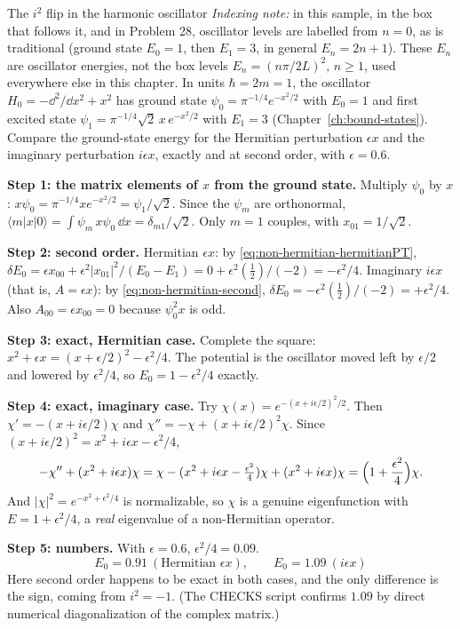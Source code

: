 \begin{sample}{The $i^2$ flip in the harmonic oscillator}
\emph{Indexing note:} in this sample, in the box that follows it, and in Problem 28, oscillator levels are labelled from $n=0$, as is traditional (ground state $E_0=1$, then $E_1=3$, in general $E_n=2n+1$). These $E_n$ are oscillator energies, not the box levels $E_n=(n\pi/2L)^2$, $n\ge1$, used everywhere else in this chapter. In units $\hbar=2m=1$, the oscillator $H_0=-\dd^2/\dd x^2+x^2$ has ground state $\psi_0=\pi^{-1/4}e^{-x^2/2}$ with $E_0=1$ and first excited state $\psi_1=\pi^{-1/4}\sqrt2\,x\,e^{-x^2/2}$ with $E_1=3$ (Chapter~\ref{ch:bound-states}). Compare the ground-state energy for the Hermitian perturbation $\epsilon x$ and the imaginary perturbation $i\epsilon x$, exactly and at second order, with $\epsilon=0.6$.

\textbf{Step 1: the matrix elements of $x$ from the ground state.} Multiply $\psi_0$ by $x$: $x\psi_0 = \pi^{-1/4}xe^{-x^2/2}=\psi_1/\sqrt2$. Since the $\psi_m$ are orthonormal, $\langle m|x|0\rangle = \int\psi_m\,x\psi_0\,\dd x = \delta_{m1}/\sqrt2$. Only $m=1$ couples, with $x_{01}=1/\sqrt2$.

\textbf{Step 2: second order.} Hermitian $\epsilon x$: by \eqref{eq:non-hermitian-hermitianPT}, $\delta E_0 = \epsilon x_{00} + \epsilon^2|x_{01}|^2/(E_0-E_1) = 0 + \epsilon^2(\tfrac12)/(-2) = -\epsilon^2/4$. Imaginary $i\epsilon x$ (that is, $A=\epsilon x$): by \eqref{eq:non-hermitian-second}, $\delta E_0 = -\epsilon^2(\tfrac12)/(-2) = +\epsilon^2/4$. Also $A_{00}=\epsilon x_{00}=0$ because $\psi_0^2x$ is odd.

\textbf{Step 3: exact, Hermitian case.} Complete the square: $x^2+\epsilon x = (x+\epsilon/2)^2-\epsilon^2/4$. The potential is the oscillator moved left by $\epsilon/2$ and lowered by $\epsilon^2/4$, so $E_0=1-\epsilon^2/4$ exactly.

\textbf{Step 4: exact, imaginary case.} Try $\chi(x)=e^{-(x+i\epsilon/2)^2/2}$. Then $\chi'=-(x+i\epsilon/2)\chi$ and $\chi''=-\chi+(x+i\epsilon/2)^2\chi$. Since $(x+i\epsilon/2)^2 = x^2+i\epsilon x-\epsilon^2/4$,
\[
-\chi''+(x^2+i\epsilon x)\chi = \chi - (x^2+i\epsilon x-\tfrac{\epsilon^2}{4})\chi + (x^2+i\epsilon x)\chi = \Bigl(1+\frac{\epsilon^2}{4}\Bigr)\chi .
\]
And $|\chi|^2=e^{-x^2+\epsilon^2/4}$ is normalizable, so $\chi$ is a genuine eigenfunction with $E=1+\epsilon^2/4$, a \emph{real} eigenvalue of a non-Hermitian operator.

\textbf{Step 5: numbers.} With $\epsilon=0.6$, $\epsilon^2/4=0.09$.
\[
\boxed{E_0 = 0.91 \ (\text{Hermitian } \epsilon x),\qquad E_0 = 1.09\ (i\epsilon x)}
\]
Here second order happens to be exact in both cases, and the only difference is the sign, coming from $i^2=-1$. (The CHECKS script confirms $1.09$ by direct numerical diagonalization of the complex matrix.)
\end{sample}

